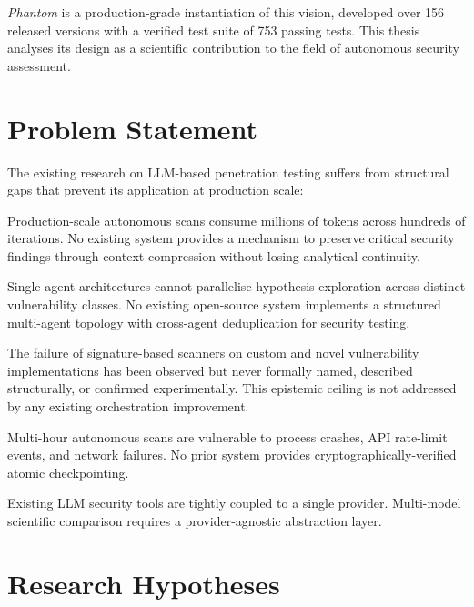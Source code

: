 \documentclass[12pt, a4paper, oneside, openany]{book}
\newcommand{\Phant}{\textit{Phantom}}
\begin{document}
\Phant{} is a production-grade instantiation of this vision, developed over 156 released versions with a verified test suite of 753 passing tests. This thesis analyses its design as a scientific contribution to the field of autonomous security assessment.

\section*{Problem Statement}

The existing research on LLM-based penetration testing suffers from structural gaps that prevent its application at production scale:

\begin{description}[leftmargin=1.5em, font=\bfseries]
  \item[G1 --- Context window management:] Production-scale autonomous scans consume millions of tokens across hundreds of iterations. No existing system provides a mechanism to preserve critical security findings through context compression without losing analytical continuity.
  \item[G2 --- Multi-agent coordination:] Single-agent architectures cannot parallelise hypothesis exploration across distinct vulnerability classes. No existing open-source system implements a structured multi-agent topology with cross-agent deduplication for security testing.
  \item[G3 --- CVE Template Gap:] The failure of signature-based scanners on custom and novel vulnerability implementations has been observed but never formally named, described structurally, or confirmed experimentally. This epistemic ceiling is not addressed by any existing orchestration improvement.
  \item[G4 --- Crash resilience:] Multi-hour autonomous scans are vulnerable to process crashes, API rate-limit events, and network failures. No prior system provides cryptographically-verified atomic checkpointing.
  \item[G5 --- Reproducibility:] Existing LLM security tools are tightly coupled to a single provider. Multi-model scientific comparison requires a provider-agnostic abstraction layer.
\end{description}

\section*{Research Hypotheses}
\end{document}
